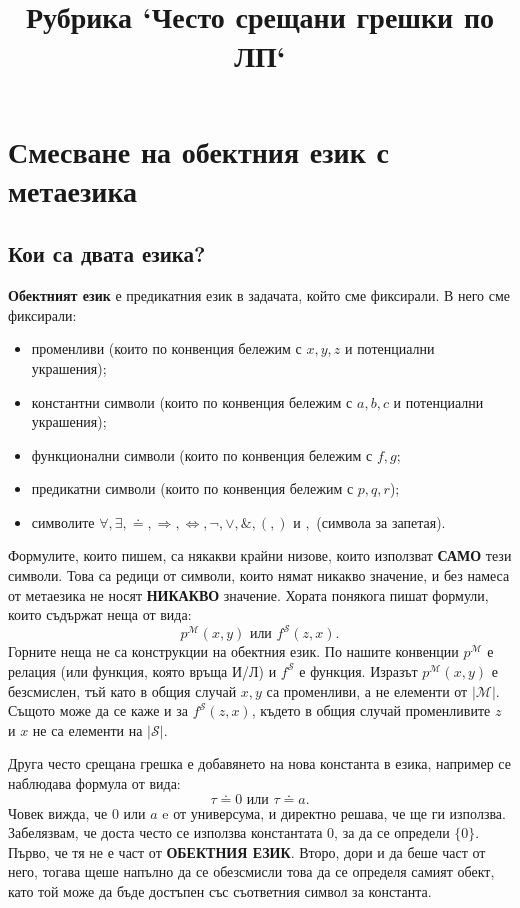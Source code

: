 \documentclass[12pt]{article}
\title{Рубрика `Често срещани грешки по ЛП`}
\date{}
\newcommand{\calS}{\mathcal{S}}
\newcommand{\calM}{\mathcal{M}}
\theoremstyle{definition}
\begin{document}
\maketitle

\section{Смесване на обектния език с метаезика}

\subsection*{Кои са двата езика?}
\textbf{Обектният език} е предикатния език в задачата, който сме фиксирали.
В него сме фиксирали:
\begin{itemize}
  \item променливи (които по конвенция бележим с $x, y, z$ и потенциални украшения);
  \item константни символи (които по конвенция бележим с $a, b, c$ и потенциални украшения);
  \item функционални символи (които по конвенция бележим с $f, g$;
  \item предикатни символи (които по конвенция бележим с $p, q, r$);
  \item символите $\forall, \exists, \doteq, \Rightarrow, \Leftrightarrow, \neg, \lor, \&, (, )$ и $,$ (символа за запетая).
\end{itemize}
Формулите, които пишем, са някакви крайни низове, които използват \textbf{САМО} тези символи.
Това са редици от символи, които нямат никакво значение, и без намеса от метаезика не носят \textbf{НИКАКВО} значение.
Хората понякога пишат формули, които съдържат неща от вида:
\[
  p^\calM(x, y) \text{ или } f^\calS(z, x).
\]
Горните неща не са конструкции на обектния език.
По нашите конвенции $p^\calM$ е релация (или функция, която връща И/Л) и $f^\calS$ е функция.
Изразът $p^\calM(x, y)$ е безсмислен, тъй като в общия случай $x, y$ са променливи, а не елементи от $|\calM|$.
Същото може да се каже и за $f^\calS(z, x)$, където в общия случай променливите $z$ и $x$ не са елементи на $|\calS|$.

Друга често срещана грешка е добавянето на нова константа в езика, например се наблюдава формула от вида:
\[
  \tau \doteq 0 \text{ или } \tau \doteq a.
\]
Човек вижда, че $0$ или $a$ e от универсума, и директно решава, че ще ги използва.
Забелязвам, че доста често се използва константата $0$, за да се определи $\{ 0 \}$.
Първо, че тя не е част от \textbf{ОБЕКТНИЯ ЕЗИК}.
Второ, дори и да беше част от него, тогава щеше напълно да се обезсмисли това да се определя самият обект, като той може да бъде достъпен със съответния символ за константа.
\end{document}
